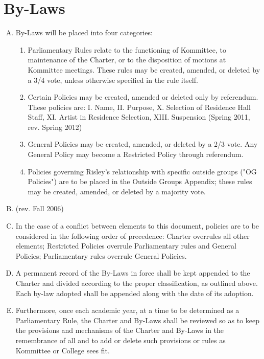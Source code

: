 \documentclass[12pt]{article}
\begin{document}
\section{By-Laws}
\begin{enumerate}[A.]
\item By-Laws will be placed into four categories:
\begin{enumerate}[1.]
\item Parliamentary Rules relate to the functioning of Kommittee, to maintenance of the Charter, or to the disposition of motions at Kommittee meetings. These rules may be created, amended, or deleted by a 3/4 vote, unless otherwise specified in the rule itself.
\item Certain Policies may be created, amended or deleted only by referendum. These policies are: I. Name, II. Purpose, X. Selection of Residence Hall Staff, XI. Artist in Residence Selection, XIII. Suspension (Spring 2011, rev. Spring 2012)
\item General Policies may be created, amended, or deleted by a 2/3 vote. Any General Policy may become a Restricted Policy through referendum.
\item Policies governing Risley's relationship with specific outside groups ("OG Policies") are to be placed in the Outside Groups Appendix; these rules may be created, amended, or deleted by a majority vote.
\end{enumerate}
\item (rev. Fall 2006)
\item In the case of a conflict between elements to this document, policies are to be considered in the following order of precedence: Charter overrules all other elements; Restricted Policies overrule Parliamentary rules and General Policies; Parliamentary rules overrule General Policies.
\item A permanent record of the By-Laws in force shall be kept appended to the Charter and divided according to the proper classification, as outlined above. Each by-law adopted shall be appended along with the date of its adoption.
\item Furthermore, once each academic year, at a time to be determined as a Parliamentary Rule, the Charter and By-Laws shall be reviewed so as to keep the provisions and mechanisms of the Charter and By-Laws in the remembrance of all and to add or delete such provisions or rules as Kommittee or College sees fit.
\end{enumerate}
\end{document}
